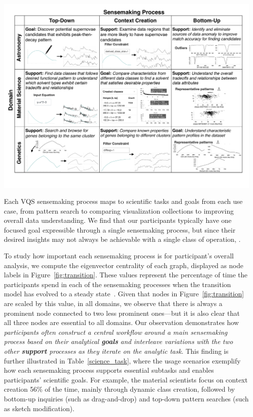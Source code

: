  \begin{table}[ht!]
   \centering
   \includegraphics[width=0.7\linewidth]{figures/science_task_new.pdf}
   \caption{ Each VQS sensemaking process maps to scientific tasks and goals from each use case, from pattern search to comparing visualization collections to improving overall data understanding. We find that our participants typically have one focused goal expressible through a single sensemaking process, but since their desired insights may not always be achievable with a single class of operation, .}%
   \label{science_task}
   \vspace{-10pt}
\end{table}
 \par To study how important each sensemaking process
 is for participant's overall analysis,
 we compute the eigenvector centrality of each graph,
 displayed as node labels in Figure~\ref{fig:transition}.
 These values represent the percentage of time the participants
 spend in each of the sensemaking processes
 when the transition model has evolved to a steady state~\cite{pierre2011}.
 Given that nodes in Figure~\ref{fig:transition}
 are scaled by this value, in all domains,
 we observe that there is always a prominent node
 connected to two less prominent ones---but it is also clear
 that all three nodes are essential to all domains.
 Our observation demonstrates how \emph{participants
 often construct a central workflow
 around a main sensemaking process based on their analytical \textbf{goals}
 and interleave variations with the two other \textbf{support} processes as they iterate on the analytic task}. This finding is further illustrated in Table~\ref{science_task}, where the usage scenarios exemplify how each sensemaking process supports essential subtasks and enables participants' scientific goals. For example, the material scientists focus on context creation 56\% of the time, mainly through dynamic class creation, followed by bottom-up inquiries (such as drag-and-drop) and top-down pattern searches (such as sketch modification).
